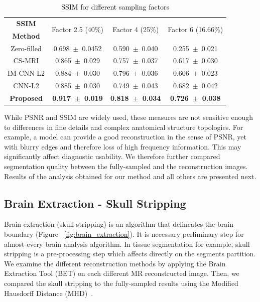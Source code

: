 \documentclass[review]{elsarticle}
\begin{document}
\begin{table}[H]
	\centering{}
	\begin{tabular}{|c||c||c||c|}
		\hline 
		\textbf{SSIM} & \multicolumn{1}{c||}{\multirow{2}{*}{Factor 2.5 (40\%)}} & \multicolumn{1}{c||}{\multirow{2}{*}{Factor 4 (25\%)}} & \multicolumn{1}{c|}{\multirow{2}{*}{Factor 6 (16.66\%)}} \tabularnewline
		\textbf{Method} & \multicolumn{1}{c||}{} & \multicolumn{1}{c||}{} & \multicolumn{1}{c|}{} \tabularnewline \cline{1-4}
		
		Zero-filled         &0.698~$\pm$~0.0452  &0.590~$\pm$~0.040   &0.255~$\pm$~0.021\tabularnewline
		CS-MRI              &0.865~$\pm$~0.029  &0.757~$\pm$~0.037   &0.617~$\pm$~0.030\tabularnewline
		IM-CNN-L2           &0.884~$\pm$~0.030  &0.796~$\pm$~0.036   &0.606~$\pm$~0.023\tabularnewline
		CNN-L2              &0.885~$\pm$~0.030  &0.749~$\pm$~0.043   &0.682~$\pm$~0.042\tabularnewline
		\textbf{Proposed}   &\textbf{0.917~$\pm$~0.019}  &\textbf{0.818~$\pm$~0.034}   &\textbf{0.726~$\pm$~0.038}\tabularnewline
		\hline 
	\end{tabular}\caption{\textcolor{black}{\footnotesize{}{}SSIM for different sampling factors}{\footnotesize{}\label{tbl:SSIM_NO_MASK}}}
\end{table}

While PSNR and SSIM are widely used, these measures are not sensitive enough to differences in fine details and complex anatomical structure topologies. For example, a model can provide a good reconstruction in the sense of PSNR, yet with blurry edges and therefore loss of high frequency information. This may significantly affect diagnostic usability. We therefore further compared segmentation quality between the fully-sampled and the reconstruction images. Results of the analysis obtained for our method and all others are presented next.

\subsection{Brain Extraction - Skull Stripping}
Brain extraction (skull stripping) is an algorithm that delineates the brain boundary (Figure~ \ref{fig:brain_extraction}). It is necessary perliminary step for almost every brain analysis algorithm. In tissue segmentation for example, skull stripping is a pre-processing step which affects directly on the segments partition. We examine the different reconstruction methods by applying the Brain Extraction Tool (BET) \cite{smith2002fast} on each different MR reconstructed image. Then, we compared the skull stripping to the fully-sampled results using the Modified Hausdorff Distance (MHD)~\cite{dubuisson1994modified}.
\end{document}
